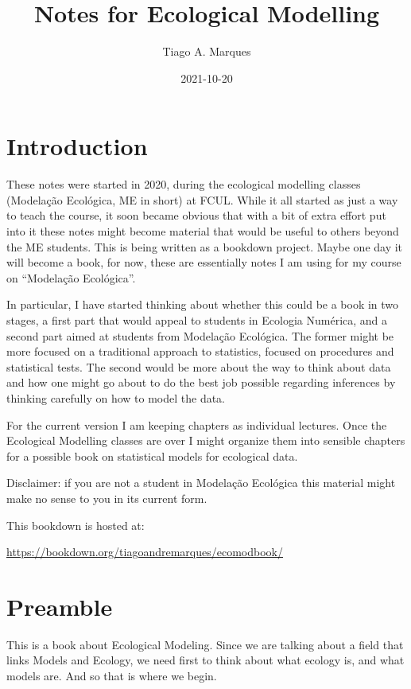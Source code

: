 \documentclass[
]{book}
\title{Notes for Ecological Modelling}
\author{Tiago A. Marques}
\date{2021-10-20}
\begin{document}
\maketitle

{
\setcounter{tocdepth}{1}
\tableofcontents
}
\hypertarget{introduction}{%
\chapter{Introduction}\label{introduction}}

These notes were started in 2020, during the ecological modelling classes (Modelação Ecológica, ME in short) at FCUL. While it all started as just a way to teach the course, it soon became obvious that with a bit of extra effort put into it these notes might become material that would be useful to others beyond the ME students. This is being written as a bookdown project. Maybe one day it will become a book, for now, these are essentially notes I am using for my course on ``Modelação Ecológica''.

In particular, I have started thinking about whether this could be a book in two stages, a first part that would appeal to students in Ecologia Numérica, and a second part aimed at students from Modelação Ecológica. The former might be more focused on a traditional approach to statistics, focused on procedures and statistical tests. The second would be more about the way to think about data and how one might go about to do the best job possible regarding inferences by thinking carefully on how to model the data.

For the current version I am keeping chapters as individual lectures. Once the Ecological Modelling classes are over I might organize them into sensible chapters for a possible book on statistical models for ecological data.

Disclaimer: if you are not a student in Modelação Ecológica this material might make no sense to you in its current form.

This bookdown is hosted at:

\url{https://bookdown.org/tiagoandremarques/ecomodbook/}

\hypertarget{mainintro}{%
\chapter{Preamble}\label{mainintro}}

This is a book about Ecological Modeling. Since we are talking about a field that links Models and Ecology, we need first to think about what ecology is, and what models are. And so that is where we begin.
\end{document}

